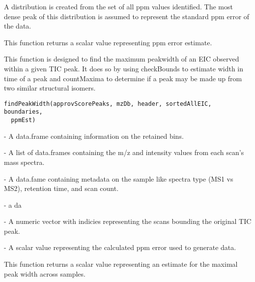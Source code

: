 \documentclass[a4paper]{book}
\begin{document}
%
\begin{Details}\relax
A distribution is created from the set of all ppm values identified.
The most dense peak of this distribution is assumed to represent the standard
ppm error of the data.
\end{Details}
%
\begin{Value}
This function returns a scalar value representing ppm error estimate.
\end{Value}
%
\begin{Description}\relax
This function is designed to find the maximum peakwidth of an EIC observed within a
given TIC peak. It does so by using checkBounds to estimate width in time of a peak and countMaxima
to determine if a peak may be made up from two similar structural isomers.
\end{Description}
%
\begin{Usage}
\begin{verbatim}
findPeakWidth(approvScorePeaks, mzDb, header, sortedAllEIC, boundaries,
  ppmEst)
\end{verbatim}
\end{Usage}
%
\begin{Arguments}
\begin{ldescription}
\item[\code{approvScorePeaks}] - A data.frame containing information on the
retained bins.

\item[\code{mzDb}] - A list of data.frames containing the m/z and intensity values
from each scan's mass spectra.

\item[\code{header}] - A data.fame containing metadata on the sample like
spectra type (MS1 vs MS2), retention time, and scan count.

\item[\code{sortedAllEIC}] - a da

\item[\code{boundaries}] - A numeric vector with indicies representing the scans
bounding the original TIC peak.

\item[\code{ppmEst}] - A scalar value representing the calculated ppm error
used to generate data.
\end{ldescription}
\end{Arguments}
%
\begin{Value}
This function returns a scalar value representing an estimate for
the maximal peak width across samples.
\end{Value}
\end{document}
